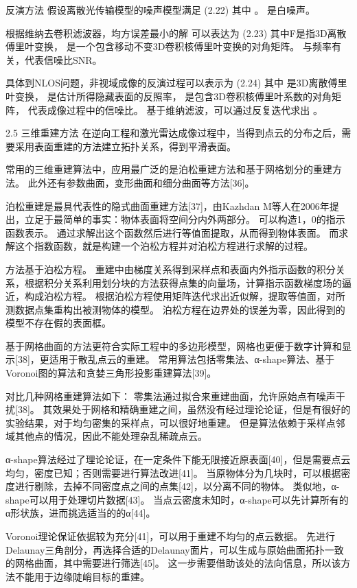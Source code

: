 反演方法
假设离散光传输模型的噪声模型满足
	  	(2.22)
其中 。
 是白噪声。

根据维纳去卷积滤波器，均方误差最小的解 可以表达为
	  	(2.23)
其中F是指3D离散傅里叶变换， 是一个包含移动不变3D卷积核傅里叶变换的对角矩阵。
 与频率有关，代表信噪比SNR。

具体到NLOS问题，非视域成像的反演过程可以表示为
	  	(2.24)
其中 是3D离散傅里叶变换， 是估计所得隐藏表面的反照率，   是包含3D卷积核傅里叶系数的对角矩阵，  代表成像过程中的信噪比。
基于维纳滤波，可以通过反复迭代求出 。


2.5  三维重建方法 
在逆向工程和激光雷达成像过程中，当得到点云的分布之后，需要采用表面重建的方法建立拓扑关系，得到平滑表面。

常用的三维重建算法中，应用最广泛的是泊松重建方法和基于网格划分的重建方法。
此外还有参数曲面，变形曲面和细分曲面等方法[36]。

泊松重建是最具代表性的隐式曲面重建方法[37]，由Kazhdan M等人在2006年提出，立足于最简单的事实：物体表面将空间分内外两部分。
可以构造1，0的指示函数表示。
通过求解出这个函数然后进行等值面提取，从而得到物体表面。
而求解这个指数函数，就是构建一个泊松方程并对泊松方程进行求解的过程。

方法基于泊松方程。
重建中由梯度关系得到采样点和表面内外指示函数的积分关系，根据积分关系利用划分块的方法获得点集的向量场，计算指示函数梯度场的逼近，构成泊松方程。
根据泊松方程使用矩阵迭代求出近似解，提取等值面，对所测数据点集重构出被测物体的模型。
泊松方程在边界处的误差为零，因此得到的模型不存在假的表面框。

基于网格曲面的方法更符合实际工程中的多边形模型，网格也更便于数字计算和显示[38]，更适用于散乱点云的重建。
常用算法包括零集法、α-shape算法、基于Voronoi图的算法和贪婪三角形投影重建算法[39]。

对比几种网格重建算法如下：
零集法通过拟合来重建曲面，允许原始点有噪声干扰[38]。
其效果处于网格和精确重建之间，虽然没有经过理论论证，但是有很好的实验结果，对于均匀密集的采样点，可以很好地重建。
但是算法依赖于采样点邻域其他点的情况，因此不能处理杂乱稀疏点云。

α-shape算法经过了理论论证，在一定条件下能无限接近原表面[40]，但是需要点云均匀，密度已知；否则需要进行算法改进[41]。
当原物体分为几块时，可以根据密度进行剔除，去掉不同密度点之间的点集[42]，以分离不同的物体。
类似地，α-shape可以用于处理切片数据[43]。
当点云密度未知时，α-shape可以先计算所有的α形状族，进而挑选适当的的α[44]。

Voronoi理论保证依据较为充分[41]，可以用于重建不均匀的点云数据。
先进行Delaunay三角剖分，再选择合适的Delaunay面片，可以生成与原始曲面拓扑一致的网格曲面，其中需要进行筛选[45]。
这一步需要借助该处的法向信息，所以该方法不能用于边缘陡峭目标的重建。

